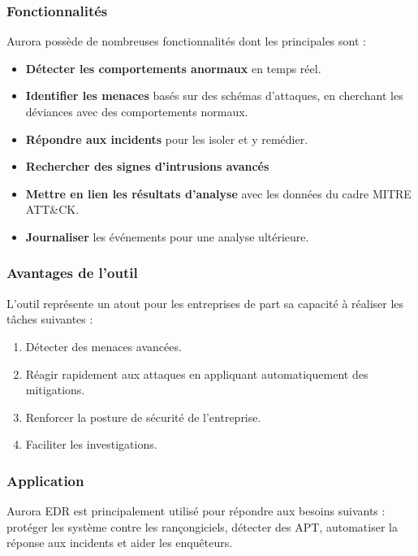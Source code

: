 \documentclass[12pt,letterpaper]{article}
\begin{document}
\subsubsection{Fonctionnalités}

Aurora possède de nombreuses fonctionnalités dont les principales sont :
\begin{itemize}
    \item \textbf{Détecter les comportements anormaux} en temps réel.
    \item \textbf{Identifier les menaces} basés sur des schémas d'attaques, en cherchant les déviances avec des comportements normaux.
    \item \textbf{Répondre aux incidents} pour les isoler et y remédier.
    \item \textbf{Rechercher des signes d'intrusions avancés}
    \item \textbf{Mettre en lien les résultats d'analyse} avec les données du cadre MITRE ATT\&CK.
    \item \textbf{Journaliser} les événements pour une analyse ultérieure.
\end{itemize}

\subsubsection{Avantages de l'outil}

L'outil représente un atout pour les entreprises de part sa capacité à réaliser les tâches suivantes :
\begin{enumerate}
    \item Détecter des menaces avancées.
    \item Réagir rapidement aux attaques en appliquant automatiquement des mitigations.
    \item Renforcer la posture de sécurité de l'entreprise.
    \item Faciliter les investigations.
\end{enumerate}

\subsubsection{Application}

Aurora EDR est principalement utilisé pour répondre aux besoins suivants : protéger les système contre les rançongiciels, détecter des APT, automatiser la réponse aux incidents et aider les enquêteurs.

\bigskip
\end{document}
